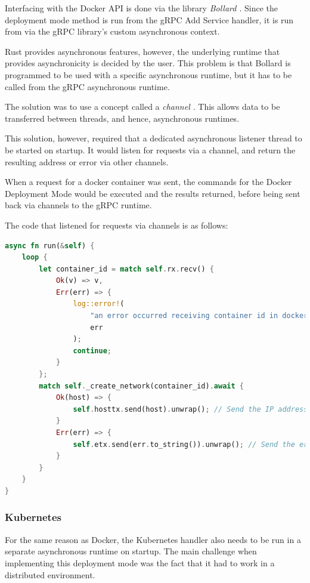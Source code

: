 \documentclass[a4paper,12pt]{report}
\begin{document}
Interfacing with the Docker API is done via the library \textit{Bollard \cite{bollard}}. 
Since the deployment mode method is run from the gRPC Add Service handler, it is run from via the gRPC library's custom asynchronous context.

Rust provides asynchronous features, however, the underlying runtime that provides asynchronicity is decided by the user. This problem is that
Bollard is programmed to be used with a specific asynchronous runtime, but it has to be called from the gRPC asynchronous runtime.

The solution was to use a concept called a \textit{channel \cite{channel}}. This allows data to be transferred between threads, and hence, asynchronous runtimes.

This solution, however, required that a dedicated asynchronous listener thread to be started on startup. It would listen for requests via a channel, and return the resulting address or error via other channels.

When a request for a docker container was sent, the commands for the Docker Deployment Mode would be executed and the results returned, before being sent back via channels to the gRPC runtime.

The code that listened for requests via channels is as follows:

\begin{lstlisting}[language=Rust]
async fn run(&self) {
    loop {
        let container_id = match self.rx.recv() {
            Ok(v) => v,
            Err(err) => {
                log::error!(
                    "an error occurred receiving container id in docker network runtime: {}",
                    err
                );
                continue;
            }
        };
        match self._create_network(container_id).await {
            Ok(host) => {
                self.hosttx.send(host).unwrap(); // Send the IP address back if successful
            }
            Err(err) => {
                self.etx.send(err.to_string()).unwrap(); // Send the error if unsuccessful.
            }
        }
    }
}
\end{lstlisting}

\subsubsection{Kubernetes}
For the same reason as Docker, the Kubernetes handler also needs to be run in a separate asynchronous runtime on startup.
The main challenge when implementing this deployment mode was the fact that it had to work in a distributed environment.
\end{document}
